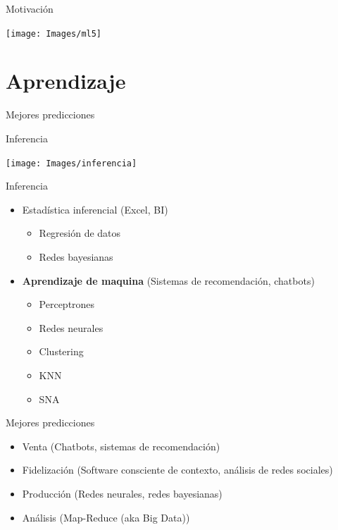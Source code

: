 \documentclass{beamer}
\begin{document}
\begin{frame}{Motivación}
    \begin{center}
        \texttt{[image: Images/ml5]}
    \end{center}
\end{frame}

\section{Aprendizaje}
\begin{frame}
    \begin{center}
        \large Mejores predicciones
    \end{center}
\end{frame}

\begin{frame}{Inferencia}
    \begin{center}
        \texttt{[image: Images/inferencia]}
    \end{center}
\end{frame}

\begin{frame}{Inferencia}
\begin{itemize}
    \item Estadística inferencial (Excel, BI)
    \begin{itemize}
        \item Regresión de datos
        \item Redes bayesianas
    \end{itemize}
    \item \textbf{Aprendizaje de maquina} (Sistemas de recomendación, chatbots)
    \begin{itemize}
        \item Perceptrones
        \item Redes neurales
        \item Clustering
        \item KNN
        \item SNA
    \end{itemize}
\end{itemize}
\end{frame}

\begin{frame}
    \begin{center}
        \large Mejores predicciones
    \end{center}
    \begin{itemize}
        \item Venta (Chatbots, sistemas de recomendación)
        \item Fidelización (Software consciente de contexto, análisis de redes sociales)
        \item Producción (Redes neurales, redes bayesianas)
        \item Análisis (Map-Reduce (aka Big Data))
    \end{itemize}
\end{frame}
\end{document}

